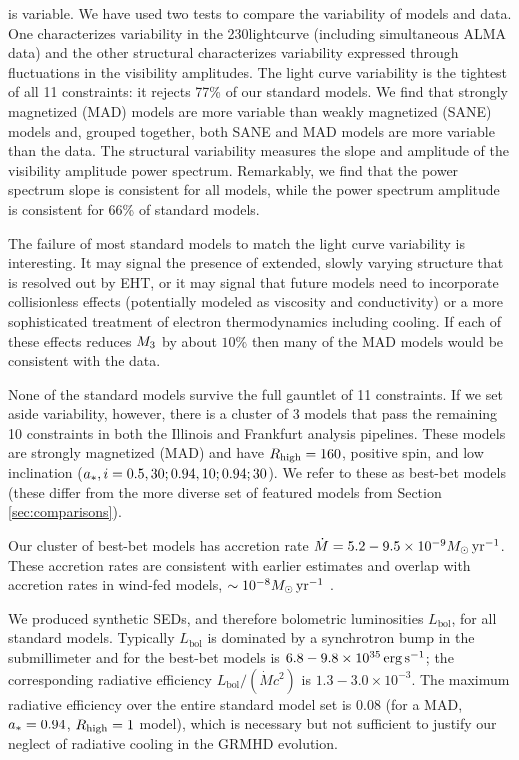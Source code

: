 \sgra is variable.  We have used two tests to compare the variability of models and data. One characterizes variability in the 230\GHz lightcurve (including simultaneous ALMA data) and the other structural characterizes variability expressed through fluctuations in the visibility amplitudes.  The light curve variability is the tightest of all 11 constraints: it rejects 77\% of our standard models.  We find that strongly magnetized (MAD) models are more variable than weakly magnetized (SANE) models and, grouped together, both SANE and MAD models are more variable than the data.  The structural variability measures the slope and amplitude of the visibility amplitude power spectrum.  Remarkably, we find that the power spectrum slope is consistent for all models, while the power spectrum amplitude is consistent for 66\% of standard models.

The failure of most standard models to match the light curve variability is interesting.  It may signal the presence of extended, slowly varying structure that is resolved out by EHT, or it may signal that future models need to incorporate collisionless effects (potentially modeled as viscosity and conductivity) or a more sophisticated treatment of electron thermodynamics including cooling.  If each of these effects reduces $M_{3}$ by about $10\%$ then many of the MAD models would be consistent with the data.

None of the standard models survive the full gauntlet of 11 constraints.  If we set aside variability, however, there is a cluster of 3 models that pass the remaining 10 constraints in both the Illinois and Frankfurt analysis pipelines. These models are strongly magnetized (MAD) and have $R_\mathrm{high} = 160$, positive spin, and low inclination ($a_*, i = 0.5, 30; 0.94, 10; 0.94; 30$).  We refer to these as best-bet models (these differ from the more diverse set of featured models from Section \ref{sec:comparisons}).

Our cluster of best-bet models has accretion rate $\dot{M} = 5.2 - 9.5 \times 10^{-9}M_\odot\,\mathrm{yr}^{-1}$.  These accretion rates are consistent with earlier estimates and overlap with accretion rates in wind-fed models, $\sim 10^{-8} M_\odot\,\mathrm{yr}^{-1}$ \citep{2020ApJ...896L...6R}.

We produced synthetic SEDs, and therefore bolometric luminosities $L_\mathrm{bol}$, for all standard models.  Typically $L_\mathrm{bol}$ is dominated by a synchrotron bump in the submillimeter and for the best-bet models is $6.8-9.8\times10^{35}\,\mathrm{erg\,s^{-1}}$; the corresponding radiative efficiency $L_\mathrm{bol}/(\dot{M} c^2)$ is $1.3-3.0\times 10^{-3}$.  The maximum radiative efficiency over the entire standard model set is 0.08 (for a MAD, $a_* = 0.94$, $R_\mathrm{high} = 1$ model), which is necessary but not sufficient to justify our neglect of radiative cooling in the GRMHD evolution.

